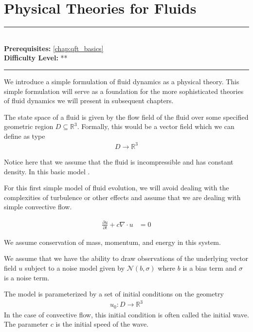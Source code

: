 \documentclass[book.tex]{subfiles}
\begin{document}
\chapter{Physical Theories for Fluids}

\label{chap:fluid_theory}
\noindent\rule{11cm}{0.4pt} \\
\textbf{Prerequisites:} \autoref{chap:qft_basics}  \\
\textbf{Difficulty Level:} ** \\
\noindent\rule{11cm}{0.4pt}
\vspace{5mm}

We introduce a simple formulation of fluid dynamics as a physical theory. This simple formulation will serve as a foundation for the more sophisticated theories of fluid dynamics we will present in subsequent chapters.

The state space of a fluid is given by the flow field of the fluid over some specified geometric region $D \subseteq \mathbb{R}^3$. Formally, this would be a vector field which we can define as type
\begin{align}
    D \to \mathbb{R}^3
\end{align}

Notice here that we assume that the fluid is incompressible and has constant density. In this basic model .

For this first simple model of fluid evolution, we will avoid dealing with the complexities of turbulence or other effects and assume that we are dealing with simple convective flow. %

\begin{align}
    \frac{\partial u}{\partial t} + c \nabla \cdot u &= 0
\end{align}

We assume conservation of mass, momentum, and energy in this system. %

We assume that we have the ability to draw observations of the underlying vector field $u$ subject to a noise model given by $\mathcal{N}(b, \sigma)$ where $b$ is a bias term and $\sigma$ is a noise term.

The model is parameterized by a set of initial conditions on the geometry
\begin{align}
    u_0: D \to \mathbb{R}^3
\end{align}
In the case of convective flow, this initial condition is often called the initial wave. The parameter $c$ is the initial speed of the wave.
\end{document}
